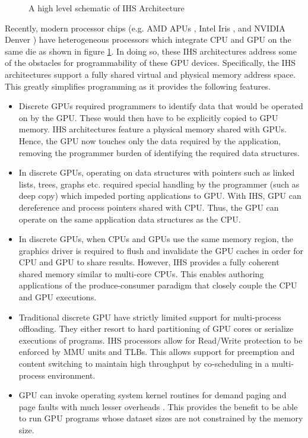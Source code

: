 \begin{figure}[!htb]
	\centering
	\def\svgwidth{\columnwidth}
	
	\caption{A high level schematic of IHS Architecture}
	\label{fig:ihs-schematic}
\end{figure}
\par Recently, modern processor chips (e.g. AMD APUs \cite{amd-apu}, Intel Iris \cite{inteliris}, and NVIDIA Denver \cite{denver}) have heterogeneous processors which integrate CPU and GPU on the same die as shown in figure \ref{fig:ihs-schematic}. In doing so, these IHS architectures address some of the obstacles for programmability of these GPU devices. Specifically, the IHS architectures support a fully shared virtual and physical memory address space. This greatly simplifies programming as it provides the following features.
\begin{itemize}
	\item Discrete GPUs required programmers to identify data that would be operated on by the GPU. These would then have to be explicitly copied to GPU memory. IHS architectures feature a physical memory shared with GPUs. Hence, the GPU now touches only the data required by the application, removing the programmer burden of identifying the required data structures.	
	\item In discrete GPUs, operating on data structures with pointers such as linked lists, trees, graphs etc. required special handling by the programmer (such as deep copy) which impeded porting applications to GPU. With IHS, GPU can dereference and process pointers shared with CPU. Thus, the GPU can operate on the same application data structures as the CPU.
	\item In discrete GPUs, when CPUs and GPUs use the same memory region, the graphics driver is required to flush and invalidate the GPU caches in order for CPU and GPU to share results. However, IHS provides a fully coherent shared memory similar to multi-core CPUs. This enables authoring applications of the produce-consumer paradigm that closely couple the CPU and GPU executions.
	\item Traditional discrete GPU have strictly limited support for multi-process offloading. They either resort to hard partitioning of GPU cores or serialize executions of programs. IHS processors allow for Read/Write protection to be enforced by MMU units and TLBs. This allows support for preemption and content switching to maintain high throughput by co-scheduling in a multi-process environment.
	\item GPU can invoke operating system kernel routines for demand paging and page faults with much lesser overheads \cite{tlb-translation}. This provides the benefit to be able to run GPU programs whose dataset sizes are not constrained by the memory size. 

\end{itemize}
